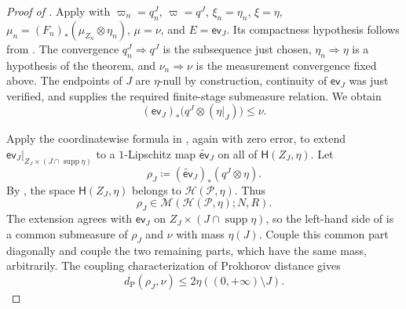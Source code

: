 \documentclass{amsart}
\numberwithin{equation}{section}
\theoremstyle{plain}
\theoremstyle{definition}
\theoremstyle{remark}
\DeclareMathOperator{\supp}{supp}
\begin{document}
\begin{proof}[Proof of ]
Apply  with
$\varpi_n=q_n^J$, $\varpi=q^J$, $\xi_n=\eta_n$, $\xi=\eta$,
$\mu_n=(F_n)_*(\mu_{Z_n}\otimes\eta_n)$, $\mu=\nu$, and $E=\mathsf{ev}_J$.  Its compactness hypothesis follows
from .  The convergence $q_n^J\Rightarrow q^J$ is the subsequence just chosen,
$\eta_n\Rightarrow\eta$ is a hypothesis of the theorem, and $\nu_n\Rightarrow\nu$ is the measurement convergence
fixed above.  The endpoints of $J$ are $\eta$-null by construction, continuity of $\mathsf{ev}_J$ was just verified,
and  supplies the required finite-stage submeasure relation.  We obtain
\begin{equation}\label{eq:joint-profile-submeasure-limit}
 (\mathsf{ev}_J)_*\bigl(q^J\otimes(\eta|_J)\bigr)
 \le\nu.
\end{equation}

Apply the coordinatewise formula in , again with zero error, to extend
$\mathsf{ev}_J|_{Z_J\times(J\cap\supp\eta)}$ to a $1$-Lipschitz map
$\widetilde{\mathsf{ev}}_J$ on all of $\mathsf H(Z_J,\eta)$.  Let
\[
 \rho_J\coloneqq(\widetilde{\mathsf{ev}}_J)_*(q^J\otimes\eta).
\]
By , the space $\mathsf H(Z_J,\eta)$ belongs to
$\mathcal H(\mathcal P,\eta)$.  Thus
\begin{equation}\label{eq:joint-target-measurement}
 \rho_J\in\mathcal M(\mathcal H(\mathcal P,\eta);N,R).
\end{equation}
The extension agrees with $\mathsf{ev}_J$ on $Z_J\times(J\cap\supp\eta)$, so the left-hand side of
 is a common submeasure of $\rho_J$ and $\nu$ with mass $\eta(J)$.
Couple this common part diagonally and couple the two remaining parts, which have the same mass, arbitrarily.  The
coupling characterization of Prokhorov distance gives
\begin{equation}\label{eq:joint-exhaustion-distance}
 d_{\mathrm P}(\rho_J,\nu)
 \le2\eta((0,+\infty)\setminus J).
\end{equation}


\end{proof}
\end{document}
